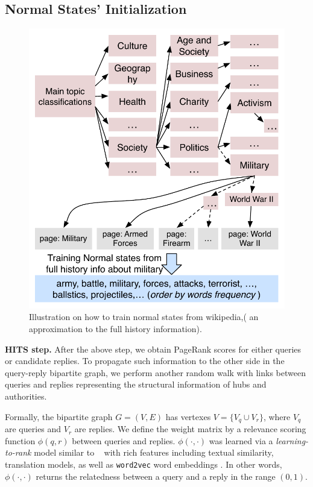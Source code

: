\documentclass{sig-alternate-05-2015}
\begin{document}
\subsection{Normal States' Initialization}
\begin{figure}
    \centering
    \includegraphics[width=1.0\columnwidth]{img/normalStatesFromHistoryInfo.pdf}  
    \caption{Illustration on how to train normal states from wikipedia,( an approximation to the full history information).}
    \label{fig:modelDesc}
\end{figure}

\textbf{HITS step.}
After the above step, we obtain PageRank scores for either queries or candidate replies. To propagate such information to the other side in the query-reply bipartite graph, we perform another random walk with links between queries and replies representing the structural information of hubs and authorities. %



Formally, the bipartite graph $G=(V,E)$ has vertexes  $V=\{V_q \cup V_r\}$, where $V_q$ are queries and $V_r$ are replies. We define the weight matrix by a relevance scoring function $\phi(q,r)$ between queries and replies. $\phi(\cdot,\cdot)$ was learned via a \textit{learning-to-rank} model similar to ~ with rich features including textual similarity, translation models, as well as {\tt word2vec} word embeddings \cite{mikolov2013distributed}. In other words, $\phi(\cdot,\cdot)$ returns the relatedness between a query and a reply in the range $(0,1)$.
\end{document}
